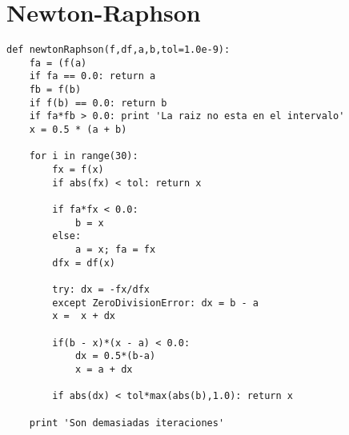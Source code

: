 \documentclass[11pt]{article}
\begin{document}
\section{Newton-Raphson}
\begin{lstlisting}
def newtonRaphson(f,df,a,b,tol=1.0e-9):
    fa = (f(a)
    if fa == 0.0: return a
    fb = f(b)
    if f(b) == 0.0: return b
    if fa*fb > 0.0: print 'La raiz no esta en el intervalo'
    x = 0.5 * (a + b)
    
    for i in range(30):
        fx = f(x)
        if abs(fx) < tol: return x

        if fa*fx < 0.0:
            b = x
        else:
            a = x; fa = fx
    	dfx = df(x)
        
        try: dx = -fx/dfx
        except ZeroDivisionError: dx = b - a
        x =  x + dx
        
        if(b - x)*(x - a) < 0.0:
            dx = 0.5*(b-a)
            x = a + dx
        
        if abs(dx) < tol*max(abs(b),1.0): return x
    
    print 'Son demasiadas iteraciones'
\end{lstlisting}
\end{document}
